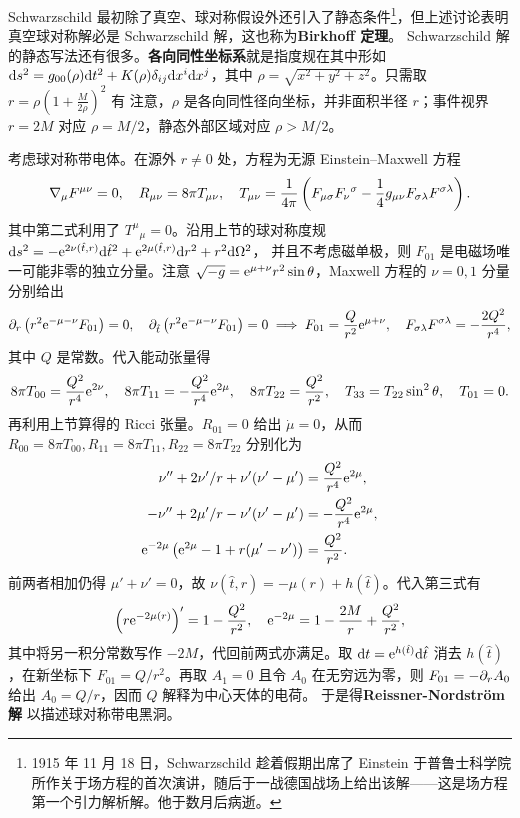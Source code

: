 Schwarzschild 最初除了真空、球对称假设外还引入了静态条件\footnote{1915 年 11 月 18 日，Schwarzschild 趁着假期出席了 Einstein 于普鲁士科学院所作关于场方程的首次演讲，随后于一战德国战场上给出该解——这是场方程第一个引力解析解。他于数月后病逝。}，但上述讨论表明真空球对称解必是 Schwarzschild 解，这也称为\textbf{Birkhoff 定理}。
Schwarzschild 解的静态写法还有很多。\textbf{各向同性坐标系}就是指度规在其中形如 $\dd s^2=g_{00}(\rho)\dd t^2+K(\rho)\delta_{ij}\dd x^i\dd x^j$，其中 $\rho=\sqrt{x^2+y^2+z^2}$。只需取 $r=\rho(1+\frac{M}{2\rho})^2$ 有
注意，$\rho$ 是各向同性径向坐标，并非面积半径 $r$；事件视界 $r=2M$ 对应 $\rho=M/2$，静态外部区域对应 $\rho>M/2$。

考虑球对称带电体。在源外 $r\ne0$ 处，方程为无源 Einstein--Maxwell 方程
\[
    \nabla_\mu F^{\mu\nu}=0,\quad R_{\mu\nu}=8\pi T_{\mu\nu},\quad
    T_{\mu\nu}=\frac{1}{4\pi}\left(F_{\mu\sigma}F_\nu{}^\sigma-\frac14g_{\mu\nu}F_{\sigma\lambda}F^{\sigma\lambda}\right).
\]
其中第二式利用了 $T^\mu{}_\mu=0$。沿用上节的球对称度规 $\dd s^2=-\mathrm{e}^{2\nu(\hat t,r)}\dd\hat t^2+\mathrm{e}^{2\mu(\hat t,r)}\dd r^2+r^2\dd\Omega^2$，
并且不考虑磁单极，则 $F_{01}$ 是电磁场唯一可能非零的独立分量。注意 $\sqrt{-g}=\mathrm{e}^{\mu+\nu}r^2\sin\theta$，Maxwell 方程的 $\nu=0,1$ 分量分别给出
\[
    \partial_r\left(r^2\mathrm{e}^{-\mu-\nu}F_{01}\right)=0,\quad
    \partial_{\hat t}\left(r^2\mathrm{e}^{-\mu-\nu}F_{01}\right)=0\implies
    F_{01}=\frac{Q}{r^2}\mathrm{e}^{\mu+\nu},\quad F_{\sigma\lambda}F^{\sigma\lambda}=-\frac{2Q^2}{r^4},
\]
其中 $Q$ 是常数。代入能动张量得
\[
    8\pi T_{00}=\frac{Q^2}{r^4}\mathrm{e}^{2\nu},\quad
    8\pi T_{11}=-\frac{Q^2}{r^4}\mathrm{e}^{2\mu},\quad
    8\pi T_{22}=\frac{Q^2}{r^2},\quad
    T_{33}=T_{22}\sin^2\theta,\quad T_{01}=0.
\]
再利用上节算得的 Ricci 张量。$R_{01}=0$ 给出 $\dot\mu=0$，从而 $R_{00}=8\pi T_{00},R_{11}=8\pi T_{11},R_{22}=8\pi T_{22}$ 分别化为
\begin{align*}
    \nu''+2\nu'/r+\nu'(\nu'-\mu')&=\frac{Q^2}{r^4}\mathrm{e}^{2\mu},\\
    -\nu''+2\mu'/r-\nu'(\nu'-\mu')&=-\frac{Q^2}{r^4}\mathrm{e}^{2\mu},\\
    \mathrm{e}^{-2\mu}\left(\mathrm{e}^{2\mu}-1+r(\mu'-\nu')\right)&=\frac{Q^2}{r^2}.
\end{align*}
前两者相加仍得 $\mu'+\nu'=0$，故 $\nu(\hat t,r)=-\mu(r)+h(\hat t)$。代入第三式有
\[
    \left(r\mathrm{e}^{-2\mu(r)}\right)'=1-\frac{Q^2}{r^2},\quad
    \mathrm{e}^{-2\mu}=1-\frac{2M}{r}+\frac{Q^2}{r^2},
\]
其中将另一积分常数写作 $-2M$，代回前两式亦满足。取 $\dd t=\mathrm{e}^{h(\hat t)}\dd\hat t$ 消去 $h(\hat t)$，在新坐标下 $F_{01}=Q/r^2$。再取 $A_1=0$ 且令 $A_0$ 在无穷远为零，则 $F_{01}=-\partial_rA_0$ 给出 $A_0=Q/r$，因而 $Q$ 解释为中心天体的电荷。
于是得\textbf{Reissner-Nordström 解}
以描述球对称带电黑洞。

